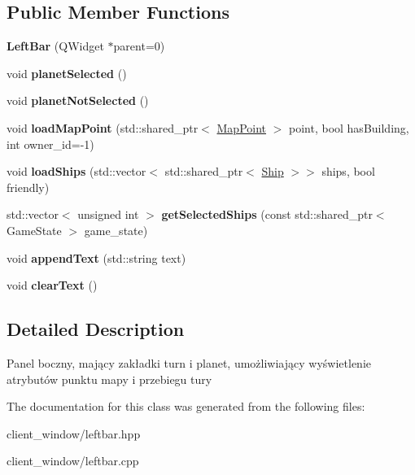 \subsection*{Public Member Functions}
\begin{DoxyCompactItemize}
\item 
{\bfseries Left\+Bar} (Q\+Widget $\ast$parent=0)\hypertarget{classLeftBar_af92e99cffc3f857048efa828ef168275}{}\label{classLeftBar_af92e99cffc3f857048efa828ef168275}

\item 
void {\bfseries planet\+Selected} ()\hypertarget{classLeftBar_afaa039120f8bb8f02f856a14ac677df3}{}\label{classLeftBar_afaa039120f8bb8f02f856a14ac677df3}

\item 
void {\bfseries planet\+Not\+Selected} ()\hypertarget{classLeftBar_af56038978c9a47606012abc0cd4dff2b}{}\label{classLeftBar_af56038978c9a47606012abc0cd4dff2b}

\item 
void {\bfseries load\+Map\+Point} (std\+::shared\+\_\+ptr$<$ \hyperlink{classMapPoint}{Map\+Point} $>$ point, bool has\+Building, int owner\+\_\+id=-\/1)\hypertarget{classLeftBar_a57f401cc62c899fc3c3559d8954256c1}{}\label{classLeftBar_a57f401cc62c899fc3c3559d8954256c1}

\item 
void {\bfseries load\+Ships} (std\+::vector$<$ std\+::shared\+\_\+ptr$<$ \hyperlink{classShip}{Ship} $>$$>$ ships, bool friendly)\hypertarget{classLeftBar_ac767661c7f477c4b0eae7c15bd2fab0e}{}\label{classLeftBar_ac767661c7f477c4b0eae7c15bd2fab0e}

\item 
std\+::vector$<$ unsigned int $>$ {\bfseries get\+Selected\+Ships} (const std\+::shared\+\_\+ptr$<$ Game\+State $>$ game\+\_\+state)\hypertarget{classLeftBar_ae9d70c20007cfec7b5d3ab39aa68a575}{}\label{classLeftBar_ae9d70c20007cfec7b5d3ab39aa68a575}

\item 
void {\bfseries append\+Text} (std\+::string text)\hypertarget{classLeftBar_a0cf867d0d1ff61bbf965255c44c992ea}{}\label{classLeftBar_a0cf867d0d1ff61bbf965255c44c992ea}

\item 
void {\bfseries clear\+Text} ()\hypertarget{classLeftBar_ac3d2665391b2b2be7c22246719e3a276}{}\label{classLeftBar_ac3d2665391b2b2be7c22246719e3a276}

\end{DoxyCompactItemize}


\subsection{Detailed Description}
Panel boczny, mający zakładki turn i planet, umożliwiający wyświetlenie atrybutów punktu mapy i przebiegu tury 

The documentation for this class was generated from the following files\+:\begin{DoxyCompactItemize}
\item 
client\+\_\+window/leftbar.\+hpp\item 
client\+\_\+window/leftbar.\+cpp\end{DoxyCompactItemize}

